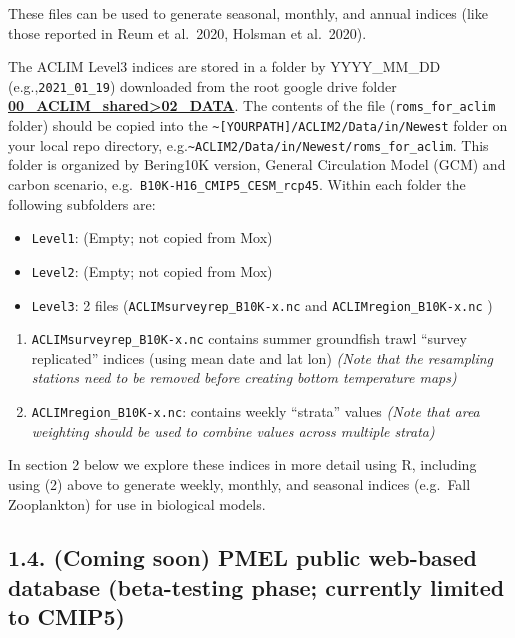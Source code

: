 \documentclass[
]{article}
\providecommand{\tightlist}{%
  \setlength{\itemsep}{0pt}\setlength{\parskip}{0pt}}
\begin{document}
These files can be used to generate seasonal, monthly, and annual
indices (like those reported in Reum et al.~2020, Holsman et al.~2020).

The ACLIM Level3 indices are stored in a folder by YYYY\_MM\_DD
(e.g.,\texttt{2021\_01\_19}) downloaded from the root google drive
folder
\href{https://drive.google.com/drive/u/0/folders/0Bx7wdZllbuF9eDJndkhCS2EwQUk}{\textbf{00\_ACLIM\_shared\textgreater02\_DATA}}.
The contents of the file (\texttt{roms\_for\_aclim} folder) should be
copied into the
\texttt{\textasciitilde{}{[}YOURPATH{]}/ACLIM2/Data/in/Newest} folder on
your local repo directory,
e.g.\texttt{\textasciitilde{}ACLIM2/Data/in/Newest/roms\_for\_aclim}.
This folder is organized by Bering10K version, General Circulation Model
(GCM) and carbon scenario, e.g.~\texttt{B10K-H16\_CMIP5\_CESM\_rcp45}.
Within each folder the following subfolders are:

\begin{itemize}
\tightlist
\item
  \texttt{Level1}: (Empty; not copied from Mox)
\item
  \texttt{Level2}: (Empty; not copied from Mox)
\item
  \texttt{Level3}: 2 files (\texttt{ACLIMsurveyrep\_B10K-x.nc} and
  \texttt{ACLIMregion\_B10K-x.nc} )
\end{itemize}

\begin{enumerate}
\def\labelenumi{\arabic{enumi})}
\tightlist
\item
  \texttt{ACLIMsurveyrep\_B10K-x.nc} contains summer groundfish trawl
  ``survey replicated'' indices (using mean date and lat lon)
  \emph{(Note that the resampling stations need to be removed before
  creating bottom temperature maps)}\\
\item
  \texttt{ACLIMregion\_B10K-x.nc}: contains weekly ``strata'' values
  \emph{(Note that area weighting should be used to combine values
  across multiple strata)}
\end{enumerate}

In section 2 below we explore these indices in more detail using R,
including using (2) above to generate weekly, monthly, and seasonal
indices (e.g.~Fall Zooplankton) for use in biological models.

\hypertarget{coming-soon-pmel-public-web-based-database-beta-testing-phase-currently-limited-to-cmip5}{%
\subsection{1.4. (Coming soon) PMEL public web-based database
(beta-testing phase; currently limited to
CMIP5)}\label{coming-soon-pmel-public-web-based-database-beta-testing-phase-currently-limited-to-cmip5}}
\end{document}
